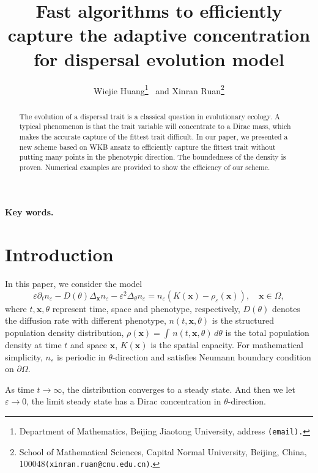 \documentclass[11pt, dina4, amsfont12]{article}
\title{Fast algorithms to efficiently capture the adaptive concentration for dispersal evolution model}
\author{
Wiejie Huang\thanks{Department of Mathematics, Beijing Jiaotong University, address {\tt (email).}} \ and
Xinran Ruan\thanks{School of Mathematical Sciences, Capital Normal University, Beijing, China, 100048{\tt (xinran.ruan@cnu.edu.cn)}.}
}
\begin{document}
\date{}
\maketitle

\begin{abstract}
The evolution of a dispersal trait is a classical question in evolutionary ecology. A typical phenomenon is that the trait variable will concentrate to a Dirac mass, which makes the accurate capture of the fittest trait difficult. 
In our paper, we presented a new scheme based on WKB ansatz to efficiently capture the fittest trait without putting many points in the phenotypic direction. The boundedness of the density is proven. Numerical examples are provided to show the efficiency of our scheme.
\end{abstract}

{\bf Key words. }  

\section{Introduction}
In this paper, we consider the model  
\begin{equation} \label{eq:n}
    \varepsilon \partial_t n_\varepsilon -D(\theta)\Delta_\mathbf{x} n_\varepsilon -\varepsilon^2\Delta_\theta n_\varepsilon = n_\varepsilon(K(\mathbf{x})-\rho_\varepsilon(\mathbf{x})), \quad \mathbf{x} \in \Omega,    
\end{equation}
where $t,\mathbf{x},\theta$ represent time, space and phenotype, respectively, $D(\theta)$ denotes the diffusion rate with different phenotype, $n(t,\mathbf{x}, \theta)$ is the structured population density distribution, $\rho(\mathbf{x}) = \int \, n(t, \mathbf{x}, \theta) \, d\theta$ is the total population density at time $t$ and space $\mathbf{x}$, $K(\mathbf{x})$ is the spatial capacity. 
For mathematical simplicity, $n_\varepsilon$ is periodic in $\theta$-direction and satisfies Neumann boundary condition on $\partial \Omega$. 


As time $t\to \infty$, the distribution converges to a steady state. And then we let $\varepsilon \to 0$, the limit steady state has a Dirac concentration in $\theta$-direction.
\end{document}
